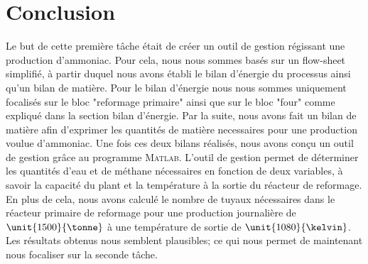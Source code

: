 \section{Conclusion}
Le but de cette première tâche était de créer un outil de gestion régissant une production d'ammoniac. 
Pour cela, nous nous sommes basés sur un flow-sheet simplifié, à partir duquel nous avons établi le bilan d'énergie du processus
ainsi qu'un bilan de matière. Pour le bilan d'énergie nous nous sommes uniquement focalisés sur le bloc "reformage primaire" ainsi
que sur le bloc "four" comme expliqué dans la section bilan d'énergie. Par la suite, nous avons fait un bilan de matière 
afin d'exprimer les quantités de matière necessaires pour une production voulue d'ammoniac. Une fois ces deux bilans 
réalisés, nous avons conçu un outil de gestion grâce au programme \textsc{Matlab}. L'outil de gestion permet de déterminer les 
quantités d'eau et de méthane nécessaires en fonction de deux variables, à savoir la capacité du plant et la température à 
la sortie du réacteur de reformage. En plus de cela, nous avons calculé le nombre de tuyaux nécessaires dans le réacteur
primaire de reformage pour une production journalière de $\unit{1500}{\tonne}$ à une température de sortie de 
$\unit{1080}{\kelvin}$. Les résultats obtenus nous semblent plausibles; ce qui nous permet de maintenant nous focaliser sur la 
seconde tâche.

